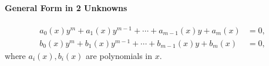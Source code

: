 \documentclass[class=article, crop=false]{standalone}
\begin{document}
  \paragraph{General Form in 2 Unknowns}
  \begin{align*}
    a_0(x)y^m + a_1(x)y^{m - 1} + \dotsb + a_{m - 1}(x)y + a_m(x) &= 0, \\
    b_0(x)y^m + b_1(x)y^{m - 1} + \dotsb + b_{m - 1}(x)y + b_m(x) &= 0,
  \end{align*}
  where $a_i(x), b_i(x)$ are polynomials in $x$.
\end{document}

